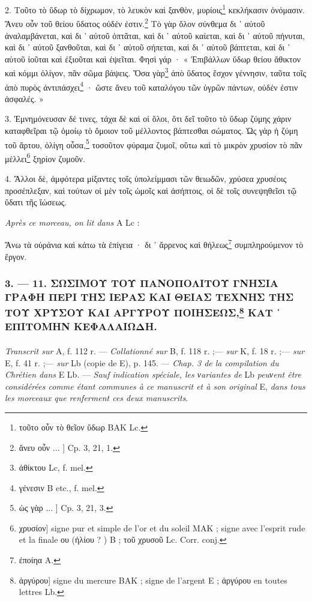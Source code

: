 \documentclass[a4paper, 11pt, oneside, polutonikogreek, french]{article}
\begin{document}
2. Τοῦτο τὸ ὕδωρ τὸ δίχρωμον, τὸ λευκὸν καὶ ξανθὸν, μυρίοις\footnote{τοῦτο οὖν τὸ θεῖον ὕδωρ BAK Lc.} κεκλήκασιν ὀνόμασιν. Ἄνευ οὖν τοῦ θείου ὕδατος οὐδέν ἐστιν.\footnote{ἄνευ οὖν ... ] Cp. 3, 21, 1.} Τὸ γὰρ ὅλον σύνθεμα δι ᾽ αὐτοῦ ἀναλαμβάνεται, καὶ δι ' αὐτοῦ ὀπτᾶται, καὶ δι ᾽ αὐτοῦ καίεται, καὶ δι ᾽ αὐτοῦ πήνυται, καὶ δι ᾽ αὐτοῦ ξανθοῦται, καὶ δι ᾽ αὐτοῦ σήπεται, καὶ δι ᾽ αὐτοῦ βάπτεται, καὶ δι ᾽ αὐτοῦ ἰοῦται καὶ ἐξιοῦται καὶ ἑψεῖται. Φησὶ γάρ · « Ἐπιβάλλων ὕδωρ θείου ἄθικτον καὶ κόμμι ὀλίγον, πᾶν σῶμα βάψεις. Ὅσα γὰρ\footnote{ἀθίκτου Lc, f. mel.} ἀπὸ ὕδατος ἔσχον γέννησιν, ταῦτα τοῖς ἀπὸ πυρὸς ἀντιπάσχει\footnote{γένεσιν B etc., f. mel.} · ὥστε ἄνευ τοῦ καταλόγου τῶν ὑγρῶν πάντων, οὐδέν ἐστιν ἀσφαλές. »

3. Ἐμνημόνευσαν δέ τινες, τάχα δὲ καὶ οἱ ὅλοι, ὅτι δεῖ τοῦτο τὸ ὕδωρ ζύμης χάριν καταφθεῖραι τῷ ὁμοίῳ τὸ ὅμοιον τοῦ μέλλοντος βάπτεσθαι σώματος. Ὡς γὰρ ἡ ζύμη τοῦ ἄρτου, ὀλίγη οὖσα,\footnote{ὡς γὰρ ... ] Cp. 3, 21, 3.} τοσοῦτον φύραμα ζυμοῖ, οὕτω καὶ τὸ μικρὸν χρυσίον τὸ πᾶν μέλλει\footnote{χρυσίον] signe pur et simple de l'or et du soleil MAK ; signe avec l'esprit rude et la finale ου (ἡλίου ? ) B ; τοῦ χρυσοῦ Lc. Corr. conj.} ξηρίον ζυμοῦν.

4. Ἄλλοι δὲ, ἀμφότερα μίξαντες τοῖς ὑπολείμμασι τῶν θειωδῶν, χρύσεα χρυσέοις προσέπλεξαν, καὶ τούτων οἱ μὲν τοῖς ὠμοῖς καὶ ἀσήπτοις, οἱ δὲ τοῖς συνεψηθεῖσι τῷ ὕδατι τῆς ἴώσεως.

\bigskip
\centerline{\EightStarTaper}
\centerline{\EightStarTaper\EightStarTaper}
\bigskip

\emph{Après ce morceau, on lit dans} A Lc :

Ἄνω τὰ οὐράνια καὶ κάτω τὰ ἐπίγεια · δι ᾽ ἄρρενος καὶ θήλεως\footnote{ἐποίηα A.} συμπληρούμενον τὸ ἔργον.

\bigskip
\centerline{\EightStarTaper}
\centerline{\EightStarTaper\EightStarTaper}
\bigskip

\subsubsection[3. --- 11. ΣΩΣΙΜΟΥ ΤΟΥ ΠΑΝΟΠΟΛΙΤΟΥ ΓΝΗΣΙΑ ΓΡΑΦΗ ΠΕΡΙ ΤΗΣ ΙΕΡΑΣ ΚΑΙ ΘΕΙΑΣ ΤΕΧΝΗΣ ΤΗΣ ΤΟΥ ΧΡΥΣΟΥ ΚΑΙ ΑΡΓΥΡΟΥ ΠΟΙΗΣΕΩΣ, ΚΑΤ ᾽ ΕΠΙΤΟΜΗΝ ΚΕΦΑΛΑΙΩΔΗ.]{3. --- 11. ΣΩΣΙΜΟΥ ΤΟΥ ΠΑΝΟΠΟΛΙΤΟΥ ΓΝΗΣΙΑ ΓΡΑΦΗ ΠΕΡΙ ΤΗΣ ΙΕΡΑΣ ΚΑΙ ΘΕΙΑΣ ΤΕΧΝΗΣ ΤΗΣ ΤΟΥ ΧΡΥΣΟΥ ΚΑΙ ΑΡΓΥΡΟΥ ΠΟΙΗΣΕΩΣ,\footnote{ἀργύρου] signe du mercure BAK ; signe de l'argent E ; ἀργύρου en toutes lettres Lb.} ΚΑΤ ᾽ ΕΠΙΤΟΜΗΝ ΚΕΦΑΛΑΙΩΔΗ.}
\paragraph{}
\emph{Transcrit sur} A, f. 112 r. --- \emph{Collationné sur} B, f. 118 r. ;--- \emph{sur} K, f. 18 r. ;--- \emph{sur} E, f. 41 r. ;--- \emph{sur} Lb (copie de E), p. 145. --- \emph{Chap. 3 de la compilation du Chrétien dans} E Lb. --- \emph{Sauf indication spéciale, les νariantes de} Lb \emph{peuνent être considérées comme étant communes à ce manuscrit et à son original} E, \emph{dans tous les morceaux que renferment ces deux manuscrits}.
\end{document}
